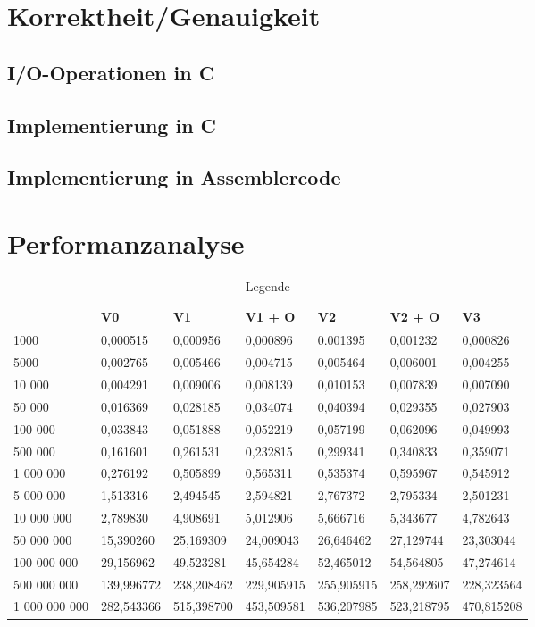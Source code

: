 \documentclass[course=asp]{aspdoc}
\begin{document}
\section{Korrektheit/Genauigkeit}
\subsection*{I/O-Operationen in C}
\subsection*{Implementierung in C}
\subsection*{Implementierung in Assemblercode}
\newpage

\section{Performanzanalyse}
\begin{table}[H]
\centering 
    \begin{tabular}{|l|l|l|l|l|l|l|}
     \hline 	       & V0 & V1 & V1 + O & V2 & V2 + O  & V3  \\
     \hline 1000 & 0,000515 & 0,000956 & 0,000896 & 0.001395 & 0,001232  & 0,000826  \\
	 \hline 5000 & 0,002765 & 0,005466 & 0,004715 & 0,005464 & 0,006001  & 0,004255  \\
	 \hline 10 000 & 0,004291 & 0,009006 & 0,008139 & 0,010153 & 0,007839  &  0,007090 \\
	 \hline 50 000 & 0,016369 & 0,028185 & 0,034074 & 0,040394 & 0,029355  & 0,027903 \\
     \hline 100 000 & 0,033843 & 0,051888 & 0,052219 & 0,057199 & 0,062096  & 0,049993 \\
	 \hline 500 000 & 0,161601 & 0,261531 & 0,232815 & 0,299341 & 0,340833 & 0,359071\\
	 \hline 1 000 000 & 0,276192 & 0,505899 & 0,565311 & 0,535374 & 0,595967  & 0,545912 \\
	 \hline 5 000 000 & 1,513316 & 2,494545 & 2,594821 & 2,767372 & 2,795334  & 2,501231\\
     \hline 10 000 000 & 2,789830 & 4,908691 & 5,012906 & 5,666716 & 5,343677  & 4,782643 \\
	 \hline 50 000 000 & 15,390260 & 25,169309 & 24,009043 & 26,646462 & 27,129744  & 23,303044  \\
	 \hline 100 000 000 & 29,156962 & 49,523281 & 45,654284 & 52,465012 & 54,564805  & 47,274614 \\
	 \hline 500 000 000 & 139,996772 & 238,208462 & 229,905915 & 255,905915 & 258,292607 & 228,323564  \\
     \hline 1 000 000 000 & 282,543366 & 515,398700 & 453,509581 & 536,207985 & 523,218795  & 470,815208 \\
	\hline
    \end{tabular}
    \caption{Legende}
\end{table}
\end{document}
